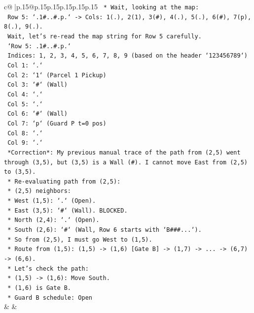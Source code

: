 \documentclass{article}
\begin{document}
{\begin{supertabular}{c@{$\;$}|p{.15\linewidth}@{}p{.15\linewidth}p{.15\linewidth}p{.15\linewidth}p{.15\linewidth}p{.15\linewidth}}
{{{\texttt{        *   Wait, looking at the map:} \\
\texttt{            Row 5: `.1\#..\#.p.` {-}> Cols: 1(.), 2(1), 3(\#), 4(.), 5(.), 6(\#), 7(p), 8(.), 9(.).} \\
\texttt{            Wait, let's re{-}read the map string for Row 5 carefully.} \\
\texttt{            `Row 5: .1\#..\#.p.`} \\
\texttt{            Indices: 1, 2, 3, 4, 5, 6, 7, 8, 9 (based on the header `123456789`)} \\
\texttt{            Col 1: `.`} \\
\texttt{            Col 2: `1` (Parcel 1 Pickup)} \\
\texttt{            Col 3: `\#` (Wall)} \\
\texttt{            Col 4: `.`} \\
\texttt{            Col 5: `.`} \\
\texttt{            Col 6: `\#` (Wall)} \\
\texttt{            Col 7: `p` (Guard P t=0 pos)} \\
\texttt{            Col 8: `.`} \\
\texttt{            Col 9: `.`} \\
\texttt{            *Correction*: My previous manual trace of the path from (2,5) went through (3,5), but (3,5) is a Wall (\#). I cannot move East from (2,5) to (3,5).} \\
\texttt{    *   Re{-}evaluating path from (2,5):} \\
\texttt{        *   (2,5) neighbors:} \\
\texttt{            *   West (1,5): `.` (Open).} \\
\texttt{            *   East (3,5): `\#` (Wall). BLOCKED.} \\
\texttt{            *   North (2,4): `.` (Open).} \\
\texttt{            *   South (2,6): `\#` (Wall, Row 6 starts with `B\#\#\#...`).} \\
\texttt{        *   So from (2,5), I must go West to (1,5).} \\
\texttt{    *   Route from (1,5): (1,5) {-}> (1,6) {[}Gate B{]} {-}> (1,7) {-}> ... {-}> (6,7) {-}> (6,6).} \\
\texttt{        *   Let's check the path:} \\
\texttt{            *   (1,5) {-}> (1,6): Move South.} \\
\texttt{            *   (1,6) is Gate B.} \\
\texttt{            *   Guard B schedule: Open} \\
            }
        }
    }
    & & \\ \\


\end{supertabular}}
\end{document}
